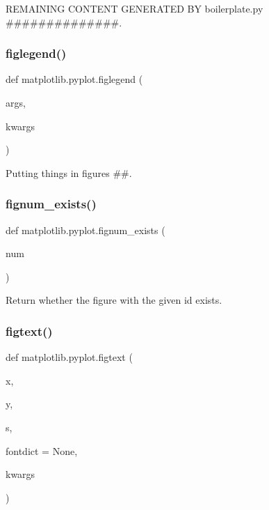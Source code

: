 R\+E\+M\+A\+I\+N\+I\+NG C\+O\+N\+T\+E\+NT G\+E\+N\+E\+R\+A\+T\+ED BY boilerplate.\+py \#\#\#\#\#\#\#\#\#\#\#\#\#\#. 

\mbox{\label{namespacematplotlib_1_1pyplot_a75715168eb3062f02d2fe7fa81919af7}} 
\subsubsection{\texorpdfstring{figlegend()}{figlegend()}}
{\footnotesize\ttfamily def matplotlib.\+pyplot.\+figlegend (\begin{DoxyParamCaption}\item[{}]{args,  }\item[{}]{kwargs }\end{DoxyParamCaption})}



Putting things in figures \#\#. 

\mbox{\label{namespacematplotlib_1_1pyplot_a8f267fb3312e891f5b756ca6dc256eca}} 
\subsubsection{\texorpdfstring{fignum\+\_\+exists()}{fignum\_exists()}}
{\footnotesize\ttfamily def matplotlib.\+pyplot.\+fignum\+\_\+exists (\begin{DoxyParamCaption}\item[{}]{num }\end{DoxyParamCaption})}

\begin{DoxyVerb}Return whether the figure with the given id exists.\end{DoxyVerb}
 \mbox{\label{namespacematplotlib_1_1pyplot_a868f2a8d6e864b41f32a29be3c19ce1e}} 
\subsubsection{\texorpdfstring{figtext()}{figtext()}}
{\footnotesize\ttfamily def matplotlib.\+pyplot.\+figtext (\begin{DoxyParamCaption}\item[{}]{x,  }\item[{}]{y,  }\item[{}]{s,  }\item[{}]{fontdict = {\ttfamily None},  }\item[{}]{kwargs }\end{DoxyParamCaption})}

